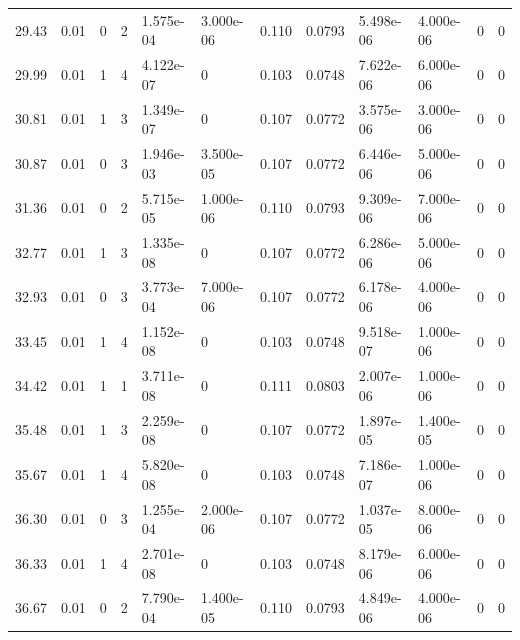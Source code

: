 \documentclass[preview]{standalone}
\begin{document}
{{{\begin{tabular}{L{1.2cm}C{1.2cm} C{0.3cm}C{0.5cm} C{1.4cm}C{1.4cm} C{1.4cm}C{1.4cm} C{1.6cm}C{1.6cm} C{1.6cm}C{1.6cm}}
  29.43  &  0.01  & 0     &  2 &  1.575e-04  & 3.000e-06  &  0.110&   0.0793& 5.498e-06 & 4.000e-06   &  0 & 0  \\ 
  29.99  &  0.01  & 1     &  4 &  4.122e-07  & 0  &  0.103&   0.0748& 7.622e-06 & 6.000e-06   &  0 & 0  \\ 
  30.81  &  0.01  & 1     &  3 &  1.349e-07  & 0  &  0.107&   0.0772& 3.575e-06 & 3.000e-06   &  0 & 0  \\ 
  30.87  &  0.01  & 0     &  3 &  1.946e-03  & 3.500e-05  &  0.107&   0.0772& 6.446e-06 & 5.000e-06   &  0 & 0  \\ 
  31.36  &  0.01  & 0     &  2 &  5.715e-05  & 1.000e-06  &  0.110&   0.0793& 9.309e-06 & 7.000e-06   &  0 & 0  \\ 
  32.77  &  0.01  & 1     &  3 &  1.335e-08  & 0  &  0.107&   0.0772& 6.286e-06 & 5.000e-06   &  0 & 0  \\ 
  32.93  &  0.01  & 0     &  3 &  3.773e-04  & 7.000e-06  &  0.107&   0.0772& 6.178e-06 & 4.000e-06   &  0 & 0  \\ 
  33.45  &  0.01  & 1     &  4 &  1.152e-08  & 0  &  0.103&   0.0748& 9.518e-07 & 1.000e-06   &  0 & 0  \\ 
  34.42  &  0.01  & 1     &  1 &  3.711e-08  & 0  &  0.111&   0.0803& 2.007e-06 & 1.000e-06   &  0 & 0  \\ 
  35.48  &  0.01  & 1     &  3 &  2.259e-08  & 0  &  0.107&   0.0772& 1.897e-05 & 1.400e-05   &  0 & 0  \\ 
  35.67  &  0.01  & 1     &  4 &  5.820e-08  & 0  &  0.103&   0.0748& 7.186e-07 & 1.000e-06   &  0 & 0  \\ 
  36.30  &  0.01  & 0     &  3 &  1.255e-04  & 2.000e-06  &  0.107&   0.0772& 1.037e-05 & 8.000e-06   &  0 & 0  \\ 
  36.33  &  0.01  & 1     &  4 &  2.701e-08  & 0  &  0.103&   0.0748& 8.179e-06 & 6.000e-06   &  0 & 0  \\ 
  36.67  &  0.01  & 0     &  2 &  7.790e-04  & 1.400e-05  &  0.110&   0.0793& 4.849e-06 & 4.000e-06   &  0 & 0  \\ 
\hline 
\end{tabular} 

}}}
\end{document}
